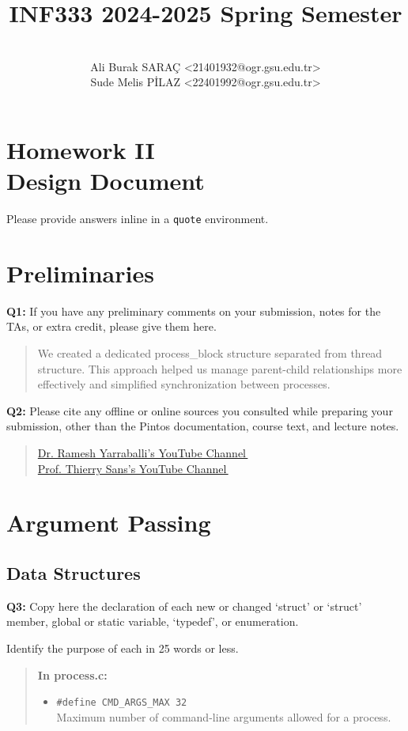\documentclass[a4paper,11pt]{paper}
\title{INF333 2024-2025 Spring Semester}
\author{
\textbf{\color{teal}{Pintocchio}}
\\ Ali Burak SARAÇ <21401932@ogr.gsu.edu.tr>
\\ Sude Melis PİLAZ <22401992@ogr.gsu.edu.tr>}
\let\orighref\href
\renewcommand{\href}[2]{\orighref{#1}{#2\,\smaller[4]\faExternalLink}}
\begin{document}
\maketitle

\section*{\LARGE Homework II \\
  Design Document}

Please provide answers inline in a \texttt{quote} environment.


\section{Preliminaries}

\textbf{Q1:} If you have any preliminary comments on your submission, notes for the TAs, or extra credit, please give them here.
\begin{quote}
  We created a dedicated process\_block structure separated from thread structure. This approach helped us manage parent-child 
relationships more effectively and simplified synchronization between processes.

\end{quote}


\textbf{Q2:} Please cite any offline or online sources you consulted while preparing your
submission, other than the Pintos documentation, course text, and lecture notes.
\begin{quote}
  \href{https://www.youtube.com/@DrY-Howto}{Dr. Ramesh Yarraballi's YouTube Channel}\\
  \href{https://www.youtube.com/@soon35}{Prof. Thierry Sans's YouTube Channel}
\end{quote}

\newpage
\section{Argument Passing}

\subsection{Data Structures}

\textbf{Q3:} Copy here the declaration of each new or changed `struct' or `struct' member, global or static variable, `typedef', or enumeration.

Identify the purpose of each in 25 words or less.
\begin{quote}   
    \textbf{In process.c:}
    \begin{itemize}
    \item \texttt{\#define CMD\_ARGS\_MAX 32} \\
       Maximum number of command-line arguments allowed for a process.
    \end{itemize}
\end{quote}
\end{document}
